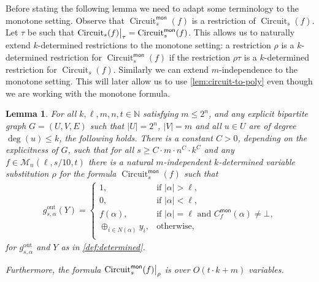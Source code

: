 \documentclass[10pt,a4paper]{article}
\theoremstyle{plain}
\newtheorem{lemma}[theorem]{Lemma}
\theoremstyle{remark}
\theoremstyle{definition}
\newcommand\restrict[2]{{%
  \left.\kern-\nulldelimiterspace %
  #1 %
  \vphantom{\big|} %
  \right|_{#2} %
  }}
\newcommand{\calM}{\mathcal{M}}
\newcommand{\N}{\mathbb{N}}
\newcommand{\mon}{{\mathsf{mon}}}
\newcommand{\gout}{g^\mathrm{out}}
\DeclareMathOperator{\circuit}{Circuit}
\begin{document}
Before stating the following lemma we need to adapt some terminology
to the monotone setting. Observe that $\circuit_s^\mon(f)$ is a
restriction of $\circuit_s(f)$. Let $\tau$ be such that
$\restrict{\circuit_s(f)}{\tau} = \circuit^\mon_s(f)$. This allows us
to naturally extend $k$-determined restrictions to the monotone
setting: a restriction $\rho$ is a $k$-determined restriction for
$\circuit^\mon_s(f)$ if the restriction $\rho \tau$ is a
$k$-determined restriction for $\circuit_s(f)$. Similarly we can
extend $m$-independence to the monotone setting. This will later allow
us to use \cref{lem:circuit-to-poly} even though we are working with
the monotone formula.


\begin{lemma}
  \label{lem:restriction-monotone}
  For all $k, \ell, m, n, t \in \N$ satisfying $m \le 2^n$, and any
  explicit bipartite graph $G = (U, V, E)$ such that $|U| = 2^n$,
  $|V| = m$ and all $u \in U$ are of degree $\deg(u) \le k$, the
  following holds.  There is a constant $C > 0$, depending on the
  explicitness of $G$, such that for all
  $s \ge C \cdot m \cdot n^C \cdot k^C$ and any
  $f \in \calM_n(\ell, s/10, t)$ there is a natural $m$-independent
  $k$-determined variable substitution $\rho$ for the formula
  $\circuit^\mon_s(f)$ such that
  \begin{align*}
    \gout_{s, \alpha}(Y) =
    \begin{cases}
      1, &\text{if~} |\alpha| > \ell,\\
      0, &\text{if~} |\alpha| < \ell,\\
      f(\alpha), &\text{if~} |\alpha| = \ell \text{~and~} C_f^\mon(\alpha) \neq \bot,\\
      \oplus_{i \in N(\alpha)} y_i, &\text{otherwise},\\
    \end{cases}
  \end{align*}
  for $\gout_{s, \alpha}$ and $Y$ as in \cref{def:determined}.

  Furthermore, the formula $\restrict{\circuit^\mon_s(f)}{\rho}$ is
  over $O(t \cdot k + m)$ variables.
\end{lemma}
\end{document}
